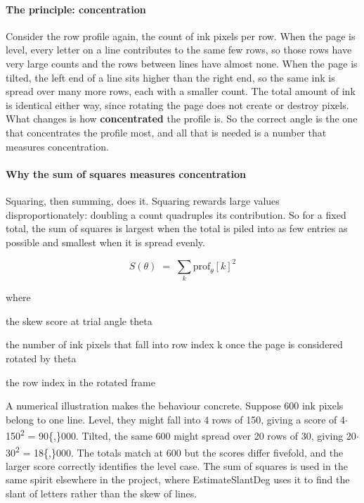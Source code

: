 \paragraph{The principle: concentration}
Consider the row profile again, the count of ink pixels per row. When the page is level, every letter on a line contributes to the same few rows, so those rows have very large counts and the rows between lines have almost none. When the page is tilted, the left end of a line sits higher than the right end, so the same ink is spread over many more rows, each with a smaller count. The total amount of ink is identical either way, since rotating the page does not create or destroy pixels. What changes is how \textbf{concentrated} the profile is. So the correct angle is the one that concentrates the profile most, and all that is needed is a number that measures concentration.


\paragraph{Why the sum of squares measures concentration}
Squaring, then summing, does it. Squaring rewards large values disproportionately: doubling a count quadruples its contribution. So for a fixed total, the sum of squares is largest when the total is piled into as few entries as possible and smallest when it is spread evenly.


\begin{equation}
S(\theta) \;=\; \sum_{k} \mathrm{prof}_{\theta}[k]^{2}
\end{equation}

\noindent where
\begin{description}[leftmargin=2.4em,style=nextline,font=\normalfont\ttfamily]\setlength\itemsep{1pt}
  \item[{$S(\theta)$}] \normalfont the skew score at trial angle theta
  \item[{$\mathrm{prof}_{\theta}[k]$}] \normalfont the number of ink pixels that fall into row index k once the page is considered rotated by theta
  \item[{$k$}] \normalfont the row index in the rotated frame
\end{description}
A numerical illustration makes the behaviour concrete. Suppose 600 ink pixels belong to one line. Level, they might fall into 4 rows of 150, giving a score of 4$\cdot$150\textsuperscript{2} = 90\{,\}000. Tilted, the same 600 might spread over 20 rows of 30, giving 20$\cdot$30\textsuperscript{2} = 18\{,\}000. The totals match at 600 but the scores differ fivefold, and the larger score correctly identifies the level case. The sum of squares is used in the same spirit elsewhere in the project, where EstimateSlantDeg uses it to find the slant of letters rather than the skew of lines.


